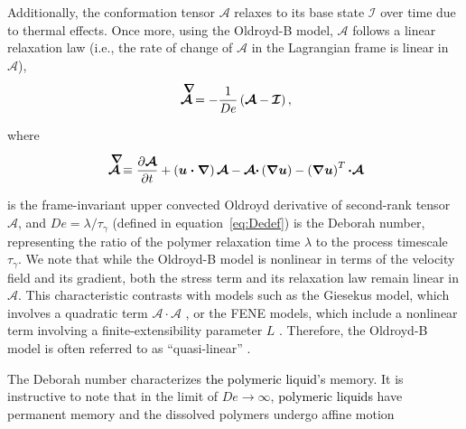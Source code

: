 \documentclass{jfm}
\newcommand{\DL}[1]{{\textcolor{black}{#1}}}
\newcommand{\oo}{\color{black} \normalfont}
\newcommand{\bb}{\color{black} \normalfont}
\begin{document}
Additionally, the conformation tensor $ \boldsymbol{\mathcal{A}}$ relaxes to its base state $\boldsymbol{\mathcal{I}}$ over time due to thermal effects.
Once more, using the Oldroyd-B model, $ \boldsymbol{\mathcal{A}}$ follows a linear relaxation law 
\oo (i.e., the rate of change of $\boldsymbol{\mathcal{A}}$ in the Lagrangian frame is linear in $\boldsymbol{\mathcal{A}}$),\bb\,

\begin{align}
	\label{Aupperconv}
	\stackrel{\smash{\raisebox{0ex}{$\mkern8mu\boldsymbol{\nabla}$}}}{\boldsymbol{\mathcal{A}}}  =  - \frac{1}{De} \left( \boldsymbol{\mathcal{A}} - \boldsymbol{\mathcal{I}}  \right),
\end{align}

\noindent where

\begin{align}
    \label{Aupper_def}
    \stackrel{\smash{\raisebox{0ex}{$\mkern8mu\boldsymbol{\nabla}$}}}{\boldsymbol{\mathcal{A}}} \equiv \frac{\partial\boldsymbol{\mathcal{A}}}{\partial t} + \left(\boldsymbol{u\cdot\nabla}\right)\boldsymbol{\mathcal{A}} - \boldsymbol{\mathcal{A}\cdot}\left(\boldsymbol{\nabla u}\right) - \left(\boldsymbol{\nabla u}\right)^T\boldsymbol{\cdot\mathcal{A}}
\end{align}

\noindent is the frame-invariant upper convected Oldroyd derivative of second-rank tensor $\boldsymbol{\mathcal{A}}$, and $De = \lambda/\tau_\gamma$ (defined in equation~\eqref{eq:Dedef}) is the Deborah number, representing the ratio of the polymer relaxation time $\lambda$ to the process timescale $\tau_\gamma$. \oo We note that while the Oldroyd-B model is nonlinear in terms of the velocity field and its gradient, both the stress term and its relaxation law remain linear in $\boldsymbol{\mathcal{A}}$. This characteristic contrasts with models such as the Giesekus model, which involves a quadratic term $\boldsymbol{\mathcal{A}\cdot\mathcal{A}}$ \citep{giesekus1982simple}, or the FENE models, which include a nonlinear term involving a finite-extensibility parameter $L$ \citep{bird1980polymer}. Therefore, the Oldroyd-B model is often referred to as ``quasi-linear”  \citep{davoodi2018secondary, alves2021numerical}\bb.

The Deborah number characterizes \DL{the polymeric liquid's} memory.
It is instructive to note that in the limit of $De \to \infty$, \DL{polymeric liquids} have permanent memory and the dissolved polymers undergo affine motion \citep[see equation~\eqref{Aupperconv} and][]{snoeijer2020relationship,stone2023note,boyko2024perspective}
\end{document}
